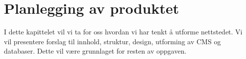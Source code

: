 \cleardoublepage
\chapter{Planlegging av produktet}
\label{chap:design} 









I dette kapittelet vil vi ta for oss hvordan vi har tenkt å utforme nettstedet. Vi vil presentere forslag til innhold, struktur, design, utforming av CMS og databaser. Dette vil være grunnlaget for resten av oppgaven.

